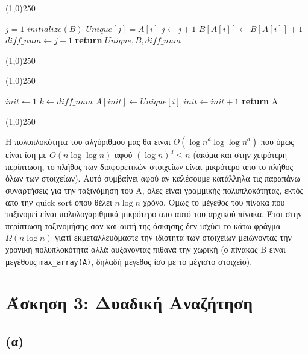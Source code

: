 \documentclass[a4paper,12pt]{report}
\begin{document}
\begin{center}
\line(1,0){250} 
\begin{algorithmic}[1]
  \State $j=1$
  \State $initialize(B)$	
      \State $Unique[j]=A[i]$	
      \State $j \gets j+1$
    \EndIf
    \State $B[A[i]] \gets B[A[i]]+1$
  \EndFor
  \State $diff\_num \gets j-1$
  \State \textbf{return} $Unique,B,diff\_num$ 
\EndProcedure
\end{algorithmic}
\line(1,0){250} 
\end{center}
\begin{center}
\line(1,0){250} 
\begin{algorithmic}[1]
  \State $init \gets 1$
  \State $k \gets diff\_num$
      \State $A[init] \gets Unique[i]$
      \State $init \gets init+1$
    \EndFor
  \EndFor
  \State \textbf{return} A 
\EndProcedure
\end{algorithmic}
\line(1,0){250} 
\end{center}
Η πολυπλοκότητα του αλγόριθμου μας θα ειναι $O({\log n}^d \log {\log n}^d)$ που όμως είναι ίση με $O(n\log \log n)$ αφού $(\log n)^d \leq n$ (ακόμα και στην χειρότερη περίπτωση, το πλήθος των διαφορετικών στοιχείων είναι μικρότερο απο το πλήθος όλων των στοιχείων). Αυτό συμβαίνει αφού αν καλέσουμε κατάλληλα τις παραπάνω συναρτήσεις για την ταξινόμηση του Α, όλες είναι γραμμικής πολυπλοκότητας, εκτός απο την quick sort όπου θέλει $n \log n$ χρόνο. Ομως το μέγεθος του πίνακα που ταξινομεί 
είναι πολυλογαριθμικά μικρότερο απο αυτό του αρχικού πίνακα. Έτσι στην περίπτωση ταξινομήσης σαν και αυτή της άσκησης δεν ισχύει το κάτω φράγμα $\Omega (n \log n)$ γιατί εκμεταλλευόμαστε την ιδιότητα των στοιχείων μειώνοντας την χρονική πολυπλοκότητα αλλά αυξάνοντας πιθανά την χωρική (ο πίνακας Β είναι μεγέθους \texttt{max\_array(A)}, δηλαδή μέγεθος ίσο με το μέγιστο στοιχείο).

\section*{Άσκηση 3: Δυαδική Αναζήτηση}
\subsection*{(α)}
\end{document}
